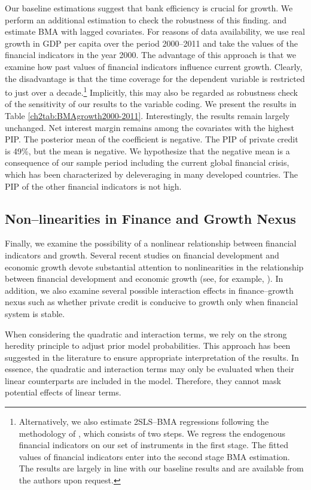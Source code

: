 \begin{refsection}
Our baseline estimations suggest that bank efficiency is crucial for growth. We perform an additional estimation to check the robustness of this finding. and estimate \ac{BMA} with lagged covariates. For reasons of data availability, we use real growth in GDP per capita over the period 2000--2011 and take the values of the financial indicators in the year 2000. The advantage of this approach is that we examine how past values of financial indicators influence current growth. Clearly, the disadvantage is that the time coverage for the dependent variable is restricted to just over a decade.\footnote{Alternatively, we also estimate 2SLS--\ac{BMA} regressions following the methodology of \textcite{Durlaufetal2008}, which consists of two steps. We regress the endogenous financial indicators on our set of instruments in the first stage. The fitted values of financial indicators enter into the second stage \ac{BMA} estimation. The results are largely in line with our baseline results and are available from the authors upon request.} Implicitly, this may also be regarded as robustness check of the sensitivity of our results to the variable coding. We present the results in Table \ref{ch2tab:BMAgrowth2000-2011}. Interestingly, the results remain largely unchanged. Net interest margin remains among the covariates with the highest \ac{PIP}. The posterior mean of the coefficient is negative. The \ac{PIP} of private credit is 49\%, but the mean is negative. We hypothesize that the negative mean is a consequence of our sample period including the current global financial crisis, which has been characterized by deleveraging in many developed countries. The \ac{PIP} of the other financial indicators is not high.

\subsection{Non--linearities in Finance and Growth Nexus}
Finally, we examine the possibility of a nonlinear relationship between financial indicators and growth. Several recent studies on financial development and economic growth devote substantial attention to nonlinearities in the relationship between financial development and economic growth (see, for example, \textcite{CecchettiKharroubi2012, LawSingh2014}). In addition, we also examine several possible interaction effects in finance--growth nexus such as whether private credit is conducive to growth only when financial system is stable.

When considering the quadratic and interaction terms, we rely on the strong heredity principle to adjust prior model probabilities. This approach has been suggested in the literature to ensure appropriate interpretation of the results. In essence, the quadratic and interaction terms may only be evaluated when their linear counterparts are included in the model. Therefore, they cannot mask potential effects of linear terms. 


\end{refsection}

